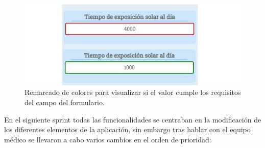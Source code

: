 \begin{figure}[h]
    \centering
     \includegraphics[width=1\textwidth]{images/remarcadoRojo.jpg}
    \caption{Remarcado de colores para visualizar si el valor cumple los requisitos del campo del formulario.}
\end{figure}
\newpage

En el siguiente sprint todas las funcionalidades se centraban en la modificación de los diferentes elementos de la aplicación, sin embargo tras hablar con el equipo médico se llevaron a cabo varios cambios en el orden de prioridad:

